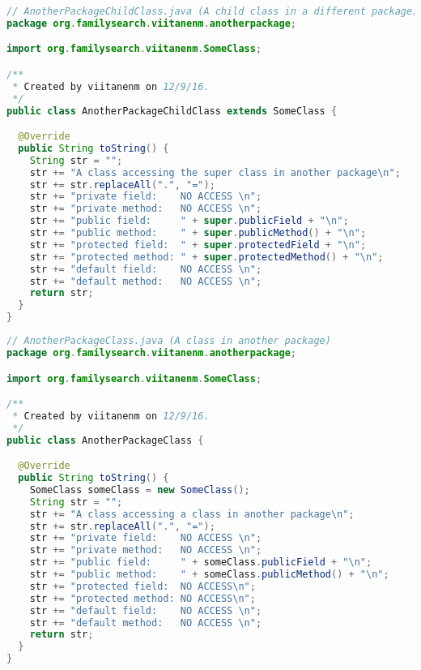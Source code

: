 \begin{lstlisting}[language=Java]
// AnotherPackageChildClass.java (A child class in a different package)
package org.familysearch.viitanenm.anotherpackage;

import org.familysearch.viitanenm.SomeClass;

/**
 * Created by viitanenm on 12/9/16.
 */
public class AnotherPackageChildClass extends SomeClass {

  @Override
  public String toString() {
    String str = "";
    str += "A class accessing the super class in another package\n";
    str += str.replaceAll(".", "=");
    str += "private field:    NO ACCESS \n";
    str += "private method:   NO ACCESS \n";
    str += "public field:     " + super.publicField + "\n";
    str += "public method:    " + super.publicMethod() + "\n";
    str += "protected field:  " + super.protectedField + "\n";
    str += "protected method: " + super.protectedMethod() + "\n";
    str += "default field:    NO ACCESS \n";
    str += "default method:   NO ACCESS \n";
    return str;
  }
}
\end{lstlisting}
\begin{lstlisting}[language=Java]
// AnotherPackageClass.java (A class in another package)
package org.familysearch.viitanenm.anotherpackage;

import org.familysearch.viitanenm.SomeClass;

/**
 * Created by viitanenm on 12/9/16.
 */
public class AnotherPackageClass {

  @Override
  public String toString() {
    SomeClass someClass = new SomeClass();
    String str = "";
    str += "A class accessing a class in another package\n";
    str += str.replaceAll(".", "=");
    str += "private field:    NO ACCESS \n";
    str += "private method:   NO ACCESS \n";
    str += "public field:     " + someClass.publicField + "\n";
    str += "public method:    " + someClass.publicMethod() + "\n";
    str += "protected field:  NO ACCESS\n";
    str += "protected method: NO ACCESS\n";
    str += "default field:    NO ACCESS \n";
    str += "default method:   NO ACCESS \n";
    return str;
  }
}
\end{lstlisting}

